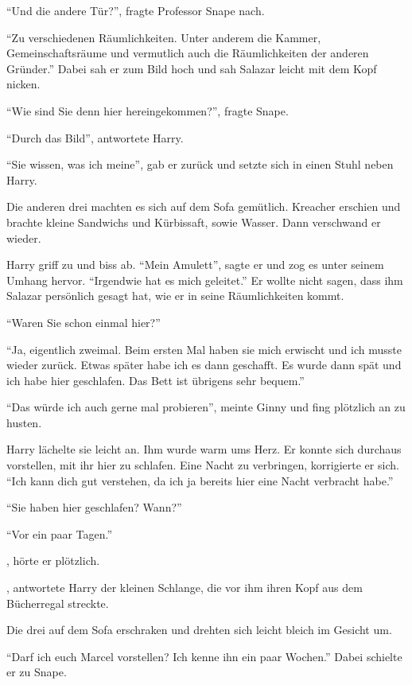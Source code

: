 \enquote{Und die andere Tür?}, fragte Professor Snape nach.

\enquote{Zu verschiedenen Räumlichkeiten. Unter anderem die Kammer, Gemeinschaftsräume und vermutlich auch die Räumlichkeiten der anderen Gründer.} Dabei sah er zum Bild hoch und sah Salazar leicht mit dem Kopf nicken.

\enquote{Wie sind Sie denn hier hereingekommen?}, fragte Snape.

\enquote{Durch das Bild}, antwortete Harry.

\enquote{Sie wissen, was ich meine}, gab er zurück und setzte sich in einen Stuhl neben Harry.

Die anderen drei machten es sich auf dem Sofa gemütlich. Kreacher erschien und brachte kleine Sandwichs und Kürbissaft, sowie Wasser. Dann verschwand er wieder.

Harry griff zu und biss ab. \enquote{Mein Amulett}, sagte er und zog es unter seinem Umhang hervor. \enquote{Irgendwie hat es mich geleitet.} Er wollte nicht sagen, dass ihm Salazar persönlich gesagt hat, wie er in seine Räumlichkeiten kommt.

\enquote{Waren Sie schon einmal hier?}

\enquote{Ja, eigentlich zweimal. Beim ersten Mal haben sie mich erwischt und ich musste wieder zurück. Etwas später habe ich es dann geschafft. Es wurde dann spät und ich habe hier geschlafen. Das Bett ist übrigens sehr bequem.}

\enquote{Das würde ich auch gerne mal probieren}, meinte Ginny und fing plötzlich an zu husten.

Harry lächelte sie leicht an. Ihm wurde warm ums Herz. Er konnte sich durchaus vorstellen, mit ihr hier zu schlafen. Eine Nacht zu verbringen, korrigierte er sich. \enquote{Ich kann dich gut verstehen, da ich ja bereits hier eine Nacht verbracht habe.}

\enquote{Sie haben hier geschlafen? Wann?}

\enquote{Vor ein paar Tagen.}

, hörte er plötzlich.

, antwortete Harry der kleinen Schlange, die vor ihm ihren Kopf aus dem Bücherregal streckte.

Die drei auf dem Sofa erschraken und drehten sich leicht bleich im Gesicht um.

\enquote{Darf ich euch Marcel vorstellen? Ich kenne ihn ein paar Wochen.} Dabei schielte er zu Snape.

